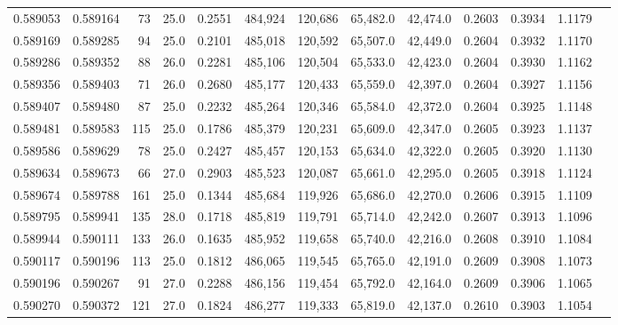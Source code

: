 \begin{tabular}{rrrrrrrrrrrrr}
0.589053 & 0.589164 &    73 & 25.0 &                                     0.2551 & 484,924 & 120,686 &  65,482.0 &  42,474.0 & 0.2603 & 0.3934 & 1.1179 \\
0.589169 & 0.589285 &    94 & 25.0 &                                     0.2101 & 485,018 & 120,592 &  65,507.0 &  42,449.0 & 0.2604 & 0.3932 & 1.1170 \\
0.589286 & 0.589352 &    88 & 26.0 &                                     0.2281 & 485,106 & 120,504 &  65,533.0 &  42,423.0 & 0.2604 & 0.3930 & 1.1162 \\
0.589356 & 0.589403 &    71 & 26.0 &                                     0.2680 & 485,177 & 120,433 &  65,559.0 &  42,397.0 & 0.2604 & 0.3927 & 1.1156 \\
0.589407 & 0.589480 &    87 & 25.0 &                                     0.2232 & 485,264 & 120,346 &  65,584.0 &  42,372.0 & 0.2604 & 0.3925 & 1.1148 \\
0.589481 & 0.589583 &   115 & 25.0 &                                     0.1786 & 485,379 & 120,231 &  65,609.0 &  42,347.0 & 0.2605 & 0.3923 & 1.1137 \\
0.589586 & 0.589629 &    78 & 25.0 &                                     0.2427 & 485,457 & 120,153 &  65,634.0 &  42,322.0 & 0.2605 & 0.3920 & 1.1130 \\
0.589634 & 0.589673 &    66 & 27.0 &                                     0.2903 & 485,523 & 120,087 &  65,661.0 &  42,295.0 & 0.2605 & 0.3918 & 1.1124 \\
0.589674 & 0.589788 &   161 & 25.0 &                                     0.1344 & 485,684 & 119,926 &  65,686.0 &  42,270.0 & 0.2606 & 0.3915 & 1.1109 \\
0.589795 & 0.589941 &   135 & 28.0 &                                     0.1718 & 485,819 & 119,791 &  65,714.0 &  42,242.0 & 0.2607 & 0.3913 & 1.1096 \\
0.589944 & 0.590111 &   133 & 26.0 &                                     0.1635 & 485,952 & 119,658 &  65,740.0 &  42,216.0 & 0.2608 & 0.3910 & 1.1084 \\
0.590117 & 0.590196 &   113 & 25.0 &                                     0.1812 & 486,065 & 119,545 &  65,765.0 &  42,191.0 & 0.2609 & 0.3908 & 1.1073 \\
0.590196 & 0.590267 &    91 & 27.0 &                                     0.2288 & 486,156 & 119,454 &  65,792.0 &  42,164.0 & 0.2609 & 0.3906 & 1.1065 \\
0.590270 & 0.590372 &   121 & 27.0 &                                     0.1824 & 486,277 & 119,333 &  65,819.0 &  42,137.0 & 0.2610 & 0.3903 & 1.1054 \\

\end{tabular}
